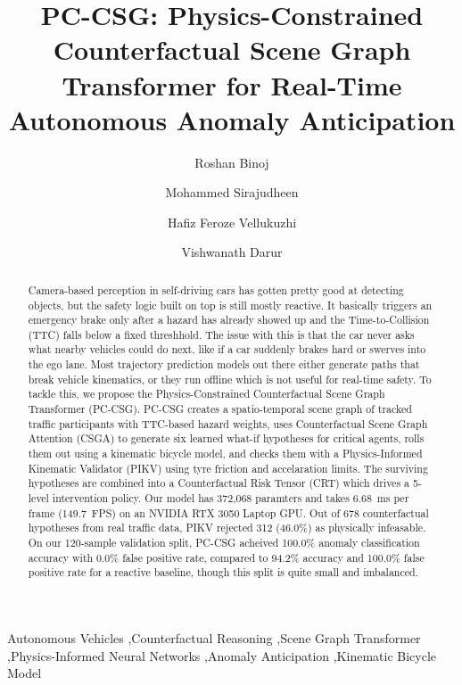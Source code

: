 \documentclass[preprint,12pt]{elsarticle}
\begin{document}
\begin{frontmatter}

\title{PC-CSG: Physics-Constrained Counterfactual Scene Graph Transformer for Real-Time Autonomous Anomaly Anticipation}

\author[1]{Roshan Binoj}
\author[1]{Mohammed Sirajudheen}
\author[1]{Hafiz Feroze Vellukuzhi}
\author[1]{Vishwanath Darur}

\address[1]{Department of Computer Science and Engineering, Indian Institute of Information Technology Kottayam, Kerala 686635, India}

\begin{abstract}
Camera-based perception in self-driving cars has gotten pretty good at detecting objects, but the safety logic built on top is still mostly reactive. It basically triggers an emergency brake only after a hazard has already showed up and the Time-to-Collision (TTC) falls below a fixed threshhold. The issue with this is that the car never asks what nearby vehicles could do next, like if a car suddenly brakes hard or swerves into the ego lane. Most trajectory prediction models out there either generate paths that break vehicle kinematics, or they run offline which is not useful for real-time safety. To tackle this, we propose the Physics-Constrained Counterfactual Scene Graph Transformer (PC-CSG). PC-CSG creates a spatio-temporal scene graph of tracked traffic participants with TTC-based hazard weights, uses Counterfactual Scene Graph Attention (CSGA) to generate six learned what-if hypotheses for critical agents, rolls them out using a kinematic bicycle model, and checks them with a Physics-Informed Kinematic Validator (PIKV) using tyre friction and accelaration limits. The surviving hypotheses are combined into a Counterfactual Risk Tensor (CRT) which drives a 5-level intervention policy. Our model has 372,068 paramters and takes 6.68~ms per frame (149.7~FPS) on an NVIDIA RTX 3050 Laptop GPU. Out of 678 counterfactual hypotheses from real traffic data, PIKV rejected 312 (46.0\%) as physically infeasable. On our 120-sample validation split, PC-CSG acheived 100.0\% anomaly classification accuracy with 0.0\% false positive rate, compared to 94.2\% accuracy and 100.0\% false positive rate for a reactive baseline, though this split is quite small and imbalanced.
\end{abstract}

\begin{keyword}
Autonomous Vehicles \sep Counterfactual Reasoning \sep Scene Graph Transformer \sep Physics-Informed Neural Networks \sep Anomaly Anticipation \sep Kinematic Bicycle Model
\end{keyword}

\end{frontmatter}
\end{document}
